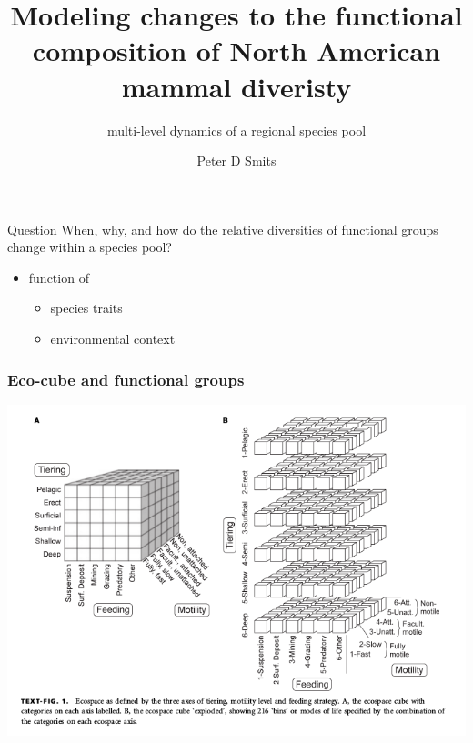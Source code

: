 \documentclass[aspectratio=169]{beamer}
\title{Modeling changes to the functional composition of North American mammal diveristy}
\subtitle{multi-level dynamics of a regional species pool}
\author{Peter D Smits}
\institute{Department of Integrative Biology, University of California -- Berkeley}
\date{}
\begin{document}
\begin{frame}
  \maketitle
\end{frame}


\begin{frame}
  \begin{alertblock}{Question}
    \alert{When}, \alert{why}, and \alert{how} do the relative diversities of functional groups change within a species pool?
    \begin{itemize}
      \item function of
        \begin{itemize}
          \item species traits
          \item environmental context
        \end{itemize}
    \end{itemize}
  \end{alertblock}
\end{frame}


\begin{frame}
  \frametitle{Eco-cube and functional groups}

  \begin{center}
    \includegraphics[height=0.775\textheight,width=\textwidth,keepaspectratio=true]{figure/ecocube}
  \end{center}

\end{frame}
\end{document}
